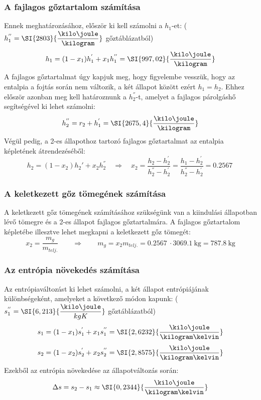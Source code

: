 \subsubsection{A fajlagos gőztartalom számítása}
Ennek meghatározásához, először ki kell számolni a $h_{1}$-et: ($h_{1}^{''} = \SI{2803}{\dfrac{\kilo\joule}{\kilogram}}$ gőztáblázatból)
\begin{equation}
	h_{1}
	=
	(1 - x_{1})h_{1}^{'} + x_{1}h_{1}^{''}
	=
	\SI{997,02}{\dfrac{\kilo\joule}{\kilogram}}
\end{equation}
A fajlagos gőztartalmat úgy kapjuk meg, hogy figyelembe vesszük, hogy az entalpia a fojtás során nem változik, a két állapot között ezért $h_{1} = h_{2}$. Ehhez először azonban meg kell határoznunk a $h_{2}^{''}$-t, amelyet a fajlagos párolgáshő segítségével ki lehet számolni:
\begin{equation}
	h_{2}^{''} = r_{2} + h_{1}^{'}
	=
	\SI{2675,4}{\dfrac{\kilo\joule}{\kilogram}}
\end{equation}
Végül pedig, a 2-es állapothoz tartozó fajlagos gőztartalmat az entalpia képletének átrendezéséből:
\begin{equation}
	h_{2} = \left(1 - x_{2}\right) h_{2}' + x_{2} h_{2}^{''}
	\quad 
	\Rightarrow
	\quad 
	x_{2}
	= 
	\dfrac{h_{2} - h_{2}^{'}}{h_{2}^{''} - h_{2}^{'}} 
	=
	\dfrac{h_{1} - h_{2}^{'}}{h_{2}^{''} - h_{2}^{'}} 
	= 
	\SI{0,2567}{}
\end{equation}

\subsubsection{A keletkezett gőz tömegének számítása}
A keletkezett gőz tömegének számításához szükségünk van a kiindulási állapotban lévő tömegre és a 2-es állapot fajlagos gőztartalmára. A fajlagos gőztartalom képletébe illesztve lehet megkapni a keletkezett gőz tömegét:
\begin{equation}
	x_{2} = \dfrac{m_{g}}{m_{telj.}}
	\qquad
	\Rightarrow
	\qquad
	m_{g} = x_{2}m_{telj.}
	=
	\SI{0,2567}{}\cdot\SI{3069,1}{\kilogram}
	=
	\SI{787,8}{\kilogram}
\end{equation}


\subsubsection{Az entrópia növekedés számítása}
Az entrópiaváltozást ki lehet számolni, a két állapot entrópiájának különbségeként, amelyeket a következő módon kapunk:
($s_{1}^{''} = \SI{6,213}{\dfrac{\kilo\joule}{kgK}}$ gőztáblázatból)
\begin{equation}
	s_{1}
	=
	(1-x_{1})s_{1}^{'} + x_{1}s_{1}^{''}
	=
	\SI{2,6232}{\dfrac{\kilo\joule}{\kilogram\kelvin}}
\end{equation}
\begin{equation}
	s_{2}
	=
	(1-x_{2})s_{2}^{'} + x_{2}s_{2}^{''}
	=
	\SI{2,8575}{\dfrac{\kilo\joule}{\kilogram\kelvin}}
\end{equation}
Ezekből az entrópia növekedése az állapotváltozás során:
\begin{equation}
	\Delta s = s_{2} - s_{1}\approx \SI{0,2344}{\dfrac{\kilo\joule}{\kilogram\kelvin}}
\end{equation}

